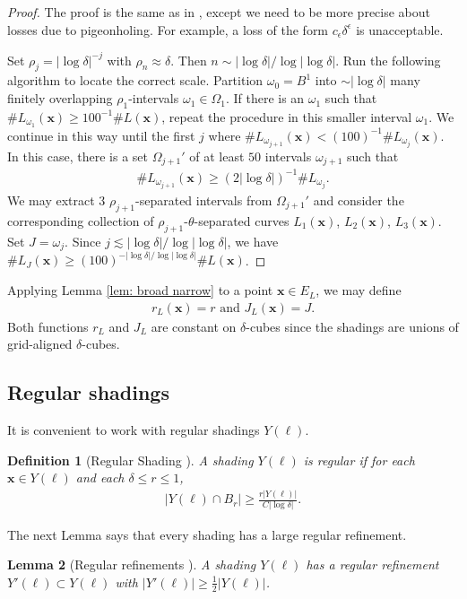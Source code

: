 \documentclass[12pt]{amsart}
\newcommand{\x}{{\bf{x}}}
\numberwithin{equation}{section}
\newtheorem{lemma}{Lemma}[section]
\newtheorem{definition}[lemma]{Definition}
\newcommand{\1}{\mathbbm{1}}
\renewcommand{\x}{\mathbf x}
\begin{document}
\begin{proof}
    The proof is the same as in \cite[Lemma 1.27]{wangwurestriction}, except we need to be more precise about losses due to pigeonholing. For example, a loss of the form $c_\epsilon \delta^\epsilon$ is unacceptable.
    
    Set $\rho_j = |\log \delta|^{-j}$ with $\rho_n \approx \delta$. Then $n \sim |\log \delta| / \log |\log \delta|$. 
    Run the following algorithm to locate the correct scale. 
    Partition $\omega_0 = B^1$ into $\sim |\log \delta|$ many finitely overlapping $\rho_1$-intervals $\omega_1 \in \Omega_1$. If there is an $\omega_1$ such that $\# L_{\omega_1}(\x) \geq 100^{-1} \# L(\x)$, repeat the procedure in this smaller interval $\omega_1$. We continue in this way until the first $j$ where $\# L_{\omega_{j+1}}(\x) < (100)^{-1} \# L_{\omega_j}(\x)$. In this case, there is a set $\Omega_{j+1}'$ of at least $50$ intervals $\omega_{j+1}$ such that
    \begin{align}
        \# L_{\omega_{j+1}}(\x) \geq (2 |\log \delta|)^{-1} \# L_{\omega_j}. 
    \end{align}
    We may extract 3 $\rho_{j+1}$-separated intervals from $\Omega_{j+1}'$ and consider the corresponding collection of $\rho_{j+1}$-$\theta$-separated curves $L_1(\x)$, $L_2(\x)$, $L_3(\x)$. Set $J = \omega_j$. Since $j \lesssim |\log \delta| / \log |\log \delta|$, we have $\# L_J(\x) \geq (100)^{-|\log \delta| / \log |\log \delta|} \# L(\x)$.
\end{proof}
Applying Lemma \ref{lem: broad narrow} to a point $\x \in E_L$, we may define 
\begin{align}
    r_L(\x) = r \text{ and } J_L(\x) = J. 
\end{align}
Both functions $r_L$ and $J_L$ are constant on $\delta$-cubes since the shadings are unions of grid-aligned $\delta$-cubes. 


\subsection{Regular shadings}
It is convenient to work with regular shadings $Y(\ell)$.
\begin{definition}[Regular Shading \cite{KWZ}]
    A shading $Y(\ell)$ is regular if for each $\x \in Y(\ell)$ and each $\delta \leq r \leq 1$, 
    \begin{align}
        |Y(\ell) \cap B_r| \geq \frac{r |Y(\ell)|}{C|\log \delta|}.
    \end{align}
\end{definition}
The next Lemma says that every shading has a large regular refinement. 
\begin{lemma}[Regular refinements ]\label{lem: regular refinement}
    A shading $Y(\ell)$ has a regular refinement $Y'(\ell) \subset Y(\ell)$ with $|Y'(\ell)| \geq \frac{1}{2} |Y(\ell)|$. 
\end{lemma}
\end{document}

